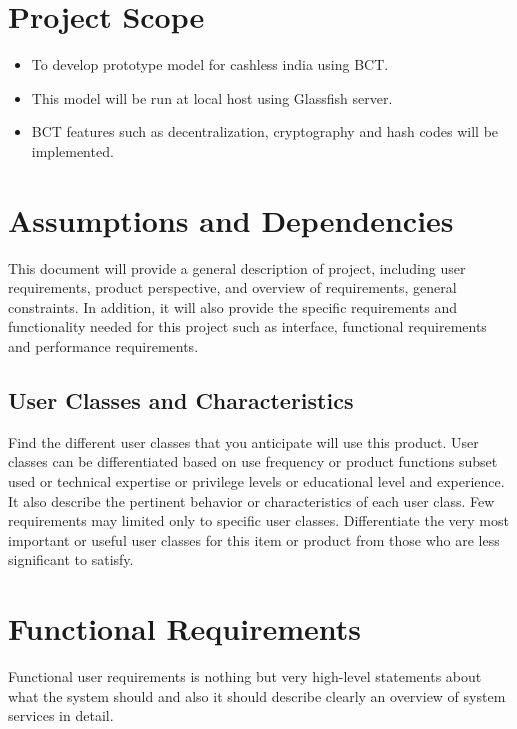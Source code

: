 \documentclass[oneside,a4paper,12pt]{report}
\begin{document}

\section{Project Scope}
\begin{itemize}
\item To develop prototype model for cashless india using BCT.
\item This model will be run at local host using Glassfish server.
\item BCT features such as decentralization, cryptography and hash codes will be implemented.
\end{itemize}

\section{Assumptions and Dependencies}
\hspace*{0.5cm} This document will provide a general description of project, including user requirements, product perspective, and overview of requirements, general constraints. In addition, it will also provide the specific requirements and functionality needed for this project such as interface, functional requirements and performance requirements.

\subsection{User Classes and Characteristics}
\hspace*{0.5cm} Find the different user classes that you anticipate will use this product. User classes can be differentiated based on use frequency or product functions subset used or technical expertise or privilege levels or educational level and experience. It also describe the pertinent behavior or characteristics of each user class. Few requirements may limited only to specific user classes. Differentiate the very most important or useful user classes for this item or product from those who are less significant to satisfy.

\section{Functional Requirements}
\hspace*{0.5cm} Functional user requirements is nothing but very high-level statements about what the system should and also it should describe clearly an overview of  system services in detail.
\end{document}
